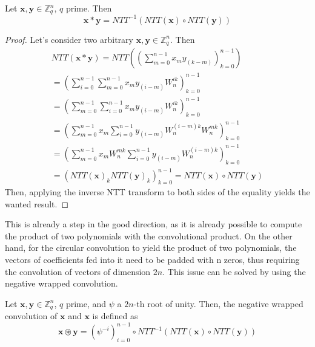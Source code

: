 \begin{theorem}
Let $\mathbf{x},\mathbf{y}\in\mathbb{Z}_q^n$, $q$ prime. Then
\begin{equation*}
\mathbf{x}\ast\mathbf{y} = NTT^{-1}(NTT(\mathbf{x}) \circ NTT(\mathbf{y}))
\end{equation*}
\end{theorem}
\begin{proof}
Let's consider two arbitrary $\mathbf{x},\mathbf{y}\in\mathbb{Z}_q^n$. Then
\begin{equation*}
\begin{aligned}
NTT(\mathbf{x}\ast\mathbf{y}) = NTT\left(\left(\sum_{m=0}^{n-1}x_{m}y_{(k-m)}\right)_{k=0}^{n-1}\right)\\
= \left(\sum_{i=0}^{n-1}\sum_{m=0}^{n-1}x_my_{(i-m)}W_n^{ik}\right)_{k=0}^{n-1}\\
= \left(\sum_{m=0}^{n-1}\sum_{i=0}^{n-1}x_my_{(i-m)}W_n^{ik}\right)_{k=0}^{n-1}\\
= \left(\sum_{m=0}^{n-1}x_m\sum_{i=0}^{n-1}y_{(i-m)}W_n^{(i-m)k}W_n^{mk}\right)_{k=0}^{n-1}\\
= \left(\sum_{m=0}^{n-1}x_mW_n^{mk}\sum_{i=0}^{n-1}y_{(i-m)}W_n^{(i-m)k}\right)_{k=0}^{n-1}\\
= \left(NTT(\mathbf{x})_kNTT(\mathbf{y})_k\right)_{k=0}^{n-1} = NTT(\mathbf{x})\circ NTT(\mathbf{y})
\end{aligned}
\end{equation*}
Then, applying the inverse NTT transform to both sides of the equality yields the wanted result.
\end{proof}

This is already a step in the good direction, as it is already possible to compute the product of two polynomials with the convolutional product. On the other hand, for the circular convolution to yield the product of two polynomials, the vectors of coefficients fed into it need to be padded with n zeros, thus requiring the convolution of vectors of dimension $2n$. This issue can be solved by using the negative wrapped convolution.

\begin{definition}
Let $\mathbf{x},\mathbf{y}\in\mathbb{Z}_q^n$, $q$ prime, and $\psi$ a $2n$-th root of unity. Then, the negative wrapped convolution of $\mathbf{x}$ and $\mathbf{x}$ is defined as
\begin{equation*}
\mathbf{x}\circledast\mathbf{y} = (\psi^{-i})_{i=0}^{n-1}\circ NTT^{-1}(NTT(\mathbf{x})\circ NTT(\mathbf{y}))
\end{equation*}
\end{definition}

